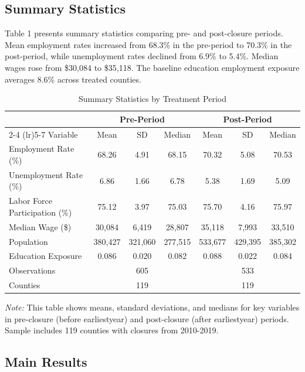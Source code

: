 \documentclass[12pt]{article}
\begin{document}
\subsection{Summary Statistics}

Table 1 presents summary statistics comparing pre- and post-closure periods. Mean employment rates increased from 68.3\% in the pre-period to 70.3\% in the post-period, while unemployment rates declined from 6.9\% to 5.4\%. Median wages rose from \$30,084 to \$35,118. The baseline education employment exposure averages 8.6\% across treated counties.

\begin{table}[H]
\centering
\caption{Summary Statistics by Treatment Period}
\label{tab:summary}
\small
\begin{tabular}{lcccccc}
\toprule
& \multicolumn{3}{c}{Pre-Period} & \multicolumn{3}{c}{Post-Period} \\
\cmidrule(lr){2-4} \cmidrule(lr){5-7}
Variable & Mean & SD & Median & Mean & SD & Median \\
\midrule
Employment Rate (\%) & 68.26 & 4.91 & 68.15 & 70.32 & 5.08 & 70.53 \\
Unemployment Rate (\%) & 6.86 & 1.66 & 6.78 & 5.38 & 1.69 & 5.09 \\
Labor Force Participation (\%) & 75.12 & 3.97 & 75.03 & 75.70 & 4.16 & 75.97 \\
Median Wage (\$) & 30,084 & 6,419 & 28,807 & 35,118 & 7,993 & 33,510 \\
Population & 380,427 & 321,060 & 277,515 & 533,677 & 429,395 & 385,302 \\
Education Exposure & 0.086 & 0.020 & 0.082 & 0.088 & 0.022 & 0.084 \\
\midrule
Observations & \multicolumn{3}{c}{605} & \multicolumn{3}{c}{533} \\
Counties & \multicolumn{3}{c}{119} & \multicolumn{3}{c}{119} \\
\bottomrule
\end{tabular}
\captionsetup{justification=raggedright,singlelinecheck=false}
\vspace{0.2cm}
\textit{Note:} This table shows means, standard deviations, and medians for key variables in pre-closure (before earliestyear) and post-closure (after earliestyear) periods. Sample includes 119 counties with closures from 2010-2019.
\end{table}

\clearpage

\subsection{Main Results}
\end{document}
